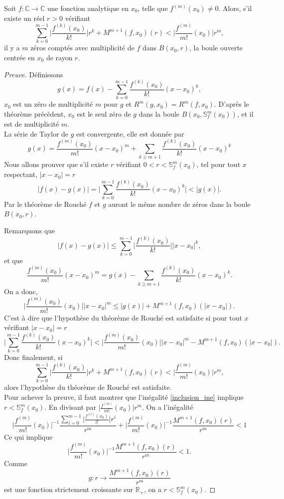 \documentclass[a4paper,10pt]{article}
\begin{document}
	\begin{theorem}
		Soit $f:\mathbb{C} \rightarrow \mathbb{C}$ une fonction analytique en $x_0$,  telle que $f^{(m)}(x_0)\neq 0$. Alors, s'il existe un réel $r>0$ vérifiant
		\[\sum_{k=0}^{m-1}\Big|\frac{f^{(k)}(x_0)}{k!}\Big|r^k+M^{m+1}(f,x_0)(r)<\Big|\frac{f^{(m)}}{m!}(x_0)\Big|r^{m},\]
		il y a $m$ zéros comptés avec multiplicité de $f$ dans $B(x_0,r)$, la boule ouverte centrée en $x_0$ de rayon $r$.
		\label{inclusion}
	\end{theorem}
	\begin{proof}[Preuve]
		Définissons \[g(x)=f(x)-\sum_{k=0}^{m-1}\frac{f^{(k)}(x_0)}{k!}(x-x_0)^k,\]
		$x_0$ est un zéro de multiplicité $m$ pour $g$ et $R^{m}(g,x_0)=R^{m}(f,x_0)$. D'après le théorème précèdent, $x_0$ est le seul zéro de $g$ dans la boule
		$B(x_0,\mathbb{S}_{f}^{m}(x_0))$, et il est de multiplicité $m$.\\
		La série de Taylor de $g$ est convergente, elle est donnée par
		\[g(x)=\frac{f^{(m)}(x_0)}{m!}(x-x_0)^m+ \sum_{k \geq m+1}\frac{f^{(k)}(x_0)}{k!}(x-x_0)^k\]
		Nous allons prouver que s'il existe $r$ vérifiant $0<r<\mathbb{S}_{f}^{m}(x_0)$, tel pour tout $x$ respectant, $|x-x_0|=r$
		\[\Big|f(x)-g(x)\Big|=\Big|\sum_{k=0}^{m-1}\frac{f^{(k)}(x_0)}{k!}(x-x_0)^k\Big|<|g(x)|.\]
		Par le théorème de Rouché $f$ et $g$ auront le même nombre de zéros dans la boule $B(x_0,r)$.
		
		\vspace{3mm}
		
		\noindent Remarquons que 
		\[\big|f(x)-g(x)\big|\leq \sum_{k=0}^{m-1}\Big|\frac{f^{(k)}(x_0)}{k!}\Big||x-x_0|^k,\]
		et que 
		\[\frac{f^{(m)}(x_0)}{m!}(x-x_0)^{m}=g(x)-\sum_{k \geq m+1}\frac{f^{(k)}(x_0)}{k!}(x-x_0)^k.\]
		On a donc,
		\[\Big|\frac{f^{(m)}(x_0)}{m!}(x_0)\Big||x-x_0|^{m} \leq |g(x)|+M^{m+1}(f,x_0)(|x-x_0|) .\]
		C'est à dire que l'hypothèse du théorème de Rouché est satisfaite si pour tout $x$ vérifiant $|x-x_0|=r$
		\[\Big|\sum_{k=0}^{m-1}\frac{f^{(k)}(x_0)}{k!}(x-x_0)^k\Big|<\Big|\frac{f^{(m)}(x_0)}{m!}(x_0)\Big||x-x_0|^{m}-M^{m+1}(f,x_0)(|x-x_0|).\] 
		Donc finalement, si
		\begin{equation}
	     	\sum_{k=0}^{m-1}\Big|\frac{f^{(k)}(x_0)}{k!}\Big|r^k+M^{m+1}(f,x_0)(r)<\Big|\frac{f^{(m)}}{m!}(x_0)\Big|r^{m},
	       	\label{inclusion_ine}
		\end{equation}
		alors l'hypothèse du théorème de Rouché est satisfaite.\\
		
		Pour achever la preuve, il faut montrer que l'inégalité \eqref{inclusion_ine} implique $r<\mathbb{S}_{f}^{m}(x_0)$.
		En divisant par $\Big|\frac{f^{(m)}}{m!}(x_0)\Big|r^{m}$. On a l'inégalité 
		\[\Big|\frac{f^{(m)}}{m!}(x_0)\Big|^{-1}\frac{\sum_{i=0}^{m-1}\Big|\frac{f^{(i)}(x_0)}{i!}\Big|r^i}{r^m}+\Big|\frac{f^{(m)}}{m!}(x_0)\Big|^{-1}\frac{M^{m+1}(f,x_0)(r)}{r^m}<1\]
		Ce qui implique
		\[\Big|\frac{f^{(m)}}{m!}(x_0)\Big|^{-1}\frac{M^{m+1}(f,x_0)(r)}{r^m}<1.\]
		Comme \[g:r\rightarrow \frac{M^{m+1}(f,x_0)(r)}{r^m}\] est une fonction strictement croissante sur $\mathbb{R}_+$, on a $r<\mathbb{S}_{f}^{m}(x_0)$.
	\end{proof}
\end{document}
